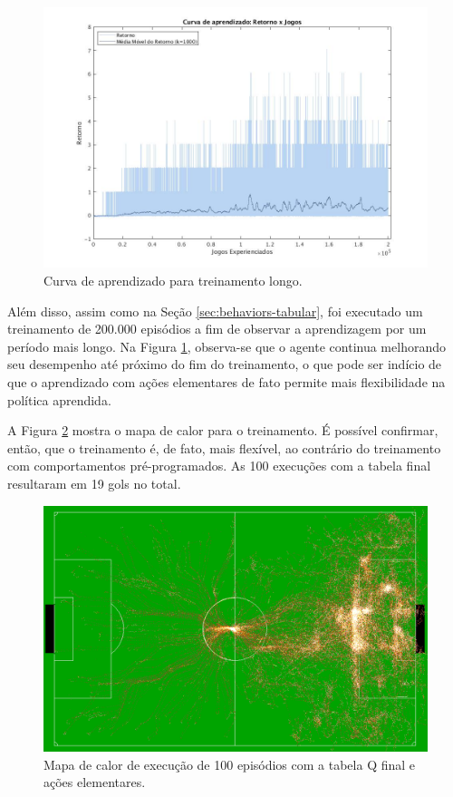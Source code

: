 \begin{figure}[H]
	\includegraphics[width=0.93\linewidth]{figs/curvalonga-qtabular.jpg}
	\centering
	\caption{Curva de aprendizado para treinamento longo.}
	\label{fig:single-agent-curvalonga}
\end{figure}

Além disso, assim como na Seção \ref{sec:behaviors-tabular}, foi executado um treinamento de 200.000 episódios a fim de observar a aprendizagem por um período mais longo. Na Figura \ref{fig:single-agent-curvalonga}, observa-se que o agente continua melhorando seu desempenho até próximo do fim do treinamento, o que pode ser indício de que o aprendizado com ações elementares de fato permite mais flexibilidade na política aprendida.

A Figura \ref{fig:actionsheat} mostra o mapa de calor para o treinamento. É possível confirmar, então, que o treinamento é, de fato, mais flexível, ao contrário do treinamento com comportamentos pré-programados. As 100 execuções com a tabela final resultaram em 19 gols no total.

\begin{figure}[H]
	\includegraphics[width=0.9\linewidth]{figs/actionsheat.png}
	\centering
	\caption{Mapa de calor de execução de 100 episódios com a tabela Q final e ações elementares.}
	\label{fig:actionsheat}
\end{figure}

